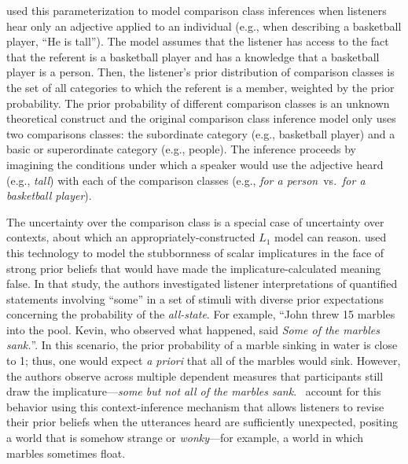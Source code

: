 \documentclass{sp}
\newcommand{\gcs}[1]{\textcolor{blue}{[gcs: #1]}}
\begin{document}
\cite{tessler2017comparisonclass} used this parameterization to model comparison class inferences when listeners hear only an adjective applied to an individual (e.g., when describing a basketball player, ``He is tall'').
The model assumes that the listener has access to the fact that the referent is a basketball player and has a knowledge that a basketball player is a person. Then, the listener's prior distribution of comparison classes is the set of all categories to which the referent is a member, weighted by the prior probability. The prior probability of different comparison classes is an unknown theoretical construct and the original comparison class inference model only uses two comparisons classes: the subordinate category (e.g., basketball player) and a basic or superordinate category (e.g., people). The inference proceeds by imagining the conditions under which a speaker would use the adjective heard (e.g., \emph{tall}) with each of the comparison classes (e.g., \emph{for a person}~vs.~\emph{for a basketball player}). 



The uncertainty over the comparison class is a special case of uncertainty over contexts, about which an appropriately-constructed $L_1$ model can reason. \cite{degen2015wonky} used this technology to model the stubbornness of scalar implicatures in the face of strong prior beliefs that would have made the implicature-calculated meaning false. In that study, the authors investigated listener interpretations of quantified statements involving ``some'' in a set of stimuli with diverse prior expectations concerning the probability of the \emph{all-state}. For example, ``John threw 15 marbles into the pool. Kevin, who observed what happened, said \emph{Some of the marbles sank.}''. In this scenario, the prior probability of a marble sinking in water is close to 1; thus, one would expect \emph{a priori} that all of the marbles would sink. However, the authors observe across multiple dependent measures that participants still draw the implicature---\emph{some but not all of the marbles sank}. \citeauthor{degen2015wonky}~account for this behavior using this context-inference mechanism that allows listeners to revise their prior beliefs when the utterances heard are sufficiently unexpected, positing a world that is somehow strange or \emph{wonky}---for example, a world in which marbles sometimes float.
\end{document}
